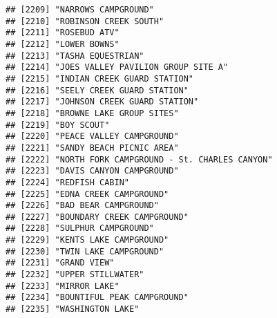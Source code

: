 \documentclass[
]{article}
\begin{document}
\begin{verbatim}
## [2209] "NARROWS CAMPGROUND"                                                                  
## [2210] "ROBINSON CREEK SOUTH"                                                                
## [2211] "ROSEBUD ATV"                                                                         
## [2212] "LOWER BOWNS"                                                                         
## [2213] "TASHA EQUESTRIAN"                                                                    
## [2214] "JOES VALLEY PAVILION GROUP SITE A"                                                   
## [2215] "INDIAN CREEK GUARD STATION"                                                          
## [2216] "SEELY CREEK GUARD STATION"                                                           
## [2217] "JOHNSON CREEK GUARD STATION"                                                         
## [2218] "BROWNE LAKE GROUP SITES"                                                             
## [2219] "BOY SCOUT"                                                                           
## [2220] "PEACE VALLEY CAMPGROUND"                                                             
## [2221] "SANDY BEACH PICNIC AREA"                                                             
## [2222] "NORTH FORK CAMPGROUND - St. CHARLES CANYON"                                          
## [2223] "DAVIS CANYON CAMPGROUND"                                                             
## [2224] "REDFISH CABIN"                                                                       
## [2225] "EDNA CREEK CAMPGROUND"                                                               
## [2226] "BAD BEAR CAMPGROUND"                                                                 
## [2227] "BOUNDARY CREEK CAMPGROUND"                                                           
## [2228] "SULPHUR CAMPGROUND"                                                                  
## [2229] "KENTS LAKE CAMPGROUND"                                                               
## [2230] "TWIN LAKE CAMPGROUND"                                                                
## [2231] "GRAND VIEW"                                                                          
## [2232] "UPPER STILLWATER"                                                                    
## [2233] "MIRROR LAKE"                                                                         
## [2234] "BOUNTIFUL PEAK CAMPGROUND"                                                           
## [2235] "WASHINGTON LAKE"                                                                     

\end{verbatim}
\end{document}
